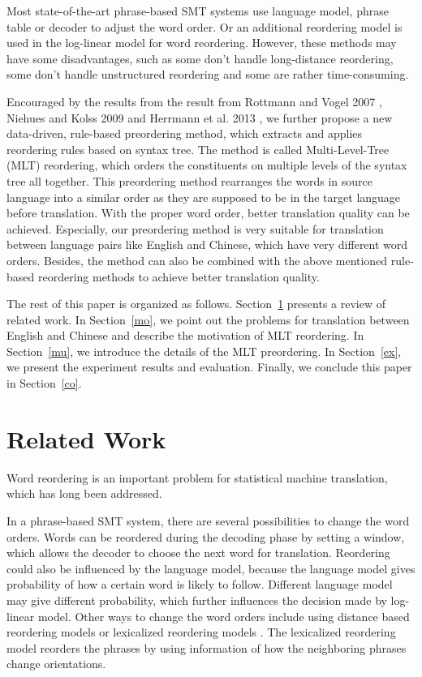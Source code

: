 \documentclass[a4paper]{article}
\begin{document}
Most state-of-the-art phrase-based SMT systems use language model, phrase table or decoder to adjust the word order. Or an additional reordering model is used in the log-linear model for word reordering. However, these methods may have some disadvantages, such as some don't handle long-distance reordering, some don't handle unstructured reordering and some are rather time-consuming.

Encouraged by the results from the result from Rottmann and Vogel 2007 \cite{short}, Niehues and Kolss 2009 \cite{long} and Herr\-mann et al. 2013 \cite{tree}, we further propose a new data-driven, rule-based preordering method, which extracts and applies reordering rules based on syntax tree. The method is called Multi-Level-Tree (MLT) reordering, which orders the constituents on multiple levels of the syntax tree all together. This preordering method rearranges the words in source language into a similar order as they are supposed to be in the target language before translation. With the proper word order, better translation quality can be achieved. Especially, our preordering method is very suitable for translation between language pairs like English and Chinese, which have very different word orders. Besides, the method can also be combined with the above mentioned rule-based reordering methods to achieve better translation quality. 

The rest of this paper is organized as follows. Section~\ref{re} presents a review of related work. In Section~\ref{mo}, we point out the problems for translation between English and Chinese and describe the motivation of MLT reordering. In Section~\ref{mu}, we introduce the details of the MLT preordering. In Section~\ref{ex}, we present the experiment results and evaluation. Finally, we conclude this paper in Section~\ref{co}.

\section{Related Work}
\label{re}

Word reordering is an important problem for statistical machine translation, which has long been addressed.

In a phrase-based SMT system, there are several possibilities to change the word orders. Words can be reordered during the decoding phase by setting a window, which allows the decoder to choose the next word for translation. Reordering could also be influenced by the language model, because the language model gives probability of how a certain word is likely to follow. Different language model may give different probability, which further influences the decision made by log-linear model. Other ways to change the word orders include using distance based reordering models or lexicalized reordering models \cite{tillmann2004, koehn2005}. The lexicalized reordering model reorders the phrases by using information of how the neighboring phrases change orientations.
\end{document}
